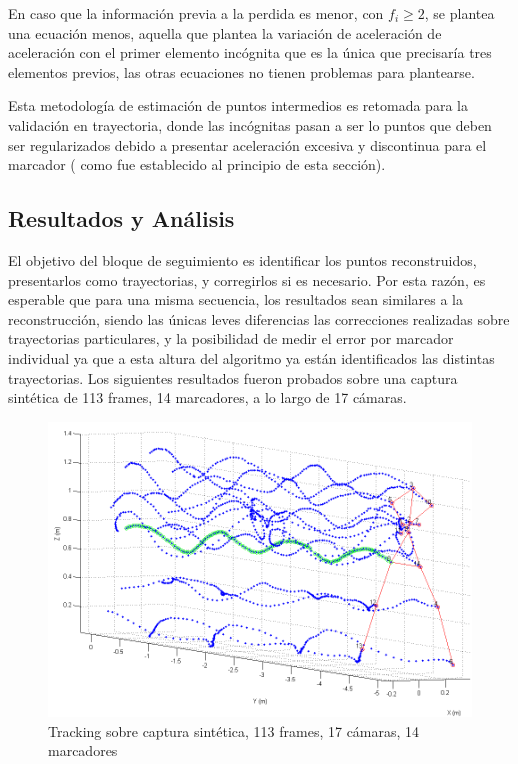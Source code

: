 En caso que la información previa a la perdida es menor, con $f_{i} \geq 2$, se plantea una ecuación menos, aquella que plantea la variación de aceleración de aceleración con el primer elemento incógnita que es la única que precisaría tres elementos previos, las otras ecuaciones no tienen problemas para plantearse.

Esta metodología de estimación de puntos intermedios es retomada para la validación en trayectoria, donde las incógnitas pasan a ser lo puntos que deben ser regularizados debido a presentar aceleración excesiva y discontinua para el marcador ( como fue establecido al principio de esta sección).




\subsection{Resultados y Análisis}

El objetivo del bloque de seguimiento es identificar los puntos reconstruidos, presentarlos como trayectorias, y corregirlos si es necesario. Por esta razón, es esperable que para una misma secuencia, los resultados sean similares a la reconstrucción, siendo las únicas leves diferencias las correcciones realizadas sobre trayectorias particulares, y la posibilidad de medir el error por marcador individual ya que a esta altura del algoritmo ya están identificados las distintas trayectorias. Los siguientes resultados fueron probados sobre una captura sintética de 113 frames, 14 marcadores, a lo largo de 17 cámaras.

\begin{figure}[hbt]
\begin{center}
\includegraphics[width=\linewidth]{img/Tracking/040_Salida_Tracking_Esqueleto_Trayectoria.png}
\end{center}
\caption{Tracking sobre captura sintética, 113 frames, 17 cámaras, 14 marcadores}
\label{Tracking_Esqueleto_Trayectoria}
\end{figure}

